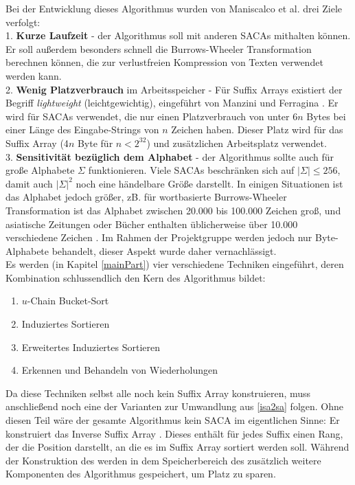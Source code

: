 Bei der Entwicklung dieses Algorithmus wurden von Maniscalco et al. drei Ziele verfolgt:\\
1. \textbf{Kurze Laufzeit} - der Algorithmus soll mit anderen SACAs mithalten können. Er soll außerdem besonders schnell die Burrows-Wheeler Transformation~\cite{BWT} berechnen können, die zur verlustfreien Kompression von Texten verwendet werden kann.\\
2. \textbf{Wenig Platzverbrauch} im Arbeitsspeicher - Für Suffix Arrays existiert der Begriff \textit{lightweight} (leichtgewichtig), eingeführt von Manzini und Ferragina \cite{saca:4}. Er wird für SACAs verwendet, die nur einen Platzverbrauch von unter 6$n$ Bytes bei einer Länge des Eingabe-Strings von $n$ Zeichen haben. Dieser Platz wird für das Suffix Array (4$n$ Byte für $n < 2^{32}$) und zusätzlichen Arbeitsplatz verwendet.\\
3. \textbf{Sensitivität bezüglich dem Alphabet} - der Algorithmus sollte auch für große Alphabete $\Sigma$ funktionieren. Viele SACAs beschränken sich auf $|\Sigma| \leq 256$, damit auch $|\Sigma|^2$ noch eine händelbare Größe darstellt. In einigen Situationen ist das Alphabet jedoch größer, zB. für wortbasierte Burrows-Wheeler Transformation ist das Alphabet zwischen 20.000 bis 100.000 Zeichen groß, und asiatische Zeitungen oder Bücher enthalten üblicherweise über 10.000 verschiedene Zeichen \cite{asianAlphabets}. Im Rahmen der Projektgruppe werden jedoch nur Byte-Alphabete behandelt, dieser Aspekt wurde daher vernachlässigt.\\
Es werden (in Kapitel \ref{mainPart}) vier verschiedene Techniken eingeführt, deren Kombination schlussendlich den Kern des Algorithmus bildet:
\begin{enumerate}
\item $u$-Chain Bucket-Sort
\item Induziertes Sortieren
\item Erweitertes Induziertes Sortieren
\item Erkennen und Behandeln von Wiederholungen
\end{enumerate}
Da diese Techniken selbst alle noch kein Suffix Array konstruieren, muss anschließend noch eine der Varianten zur Umwandlung aus \ref{isa2sa} folgen. Ohne diesen Teil wäre der gesamte Algorithmus kein SACA im eigentlichen Sinne: Er konstruiert das Inverse Suffix Array \isa. Dieses enthält für jedes Suffix einen Rang, der die Position darstellt, an die es im Suffix Array sortiert werden soll. Während der Konstruktion des \isa werden in dem Speicherbereich des \isa zusätzlich weitere Komponenten des Algorithmus gespeichert, um Platz zu sparen.\\

